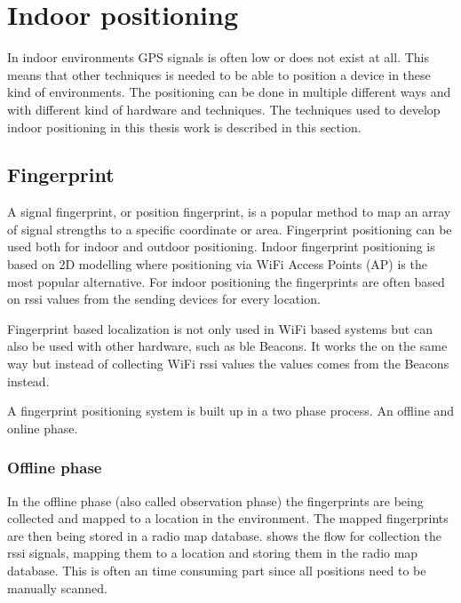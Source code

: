 \section{Indoor positioning} \label{sec:theoryIndoorPositioning}
In indoor environments GPS signals is often low or does not exist at all.
This means that other techniques is needed to be able to position a device in these kind of environments.
The positioning can be done in multiple different ways and with different kind of hardware and techniques.
The techniques used to develop indoor positioning in this thesis work is described in this section.



\subsection{Fingerprint}\label{sec:theoryFingerprint}
A signal fingerprint, or position fingerprint, is a popular method to map an array of signal strengths to a specific coordinate or area.
Fingerprint positioning can be used both for indoor and outdoor positioning.
Indoor fingerprint positioning is based on 2D modelling where positioning via WiFi Access Points (AP) is the most popular alternative.
For indoor positioning the fingerprints are often based on \acrshort{rssi} values from the sending devices for every location. 
\cite{LocationFingerprintingInfrastructure2004, IndoorFingerprintPositioning2017}

\bigskip

Fingerprint based localization is not only used in WiFi based systems but can also be used with other hardware, such as \acrshort{ble} Beacons.
It works the on the same way but instead of collecting WiFi \acrshort{rssi} values the values comes from the Beacons instead.
\cite{PracticalFingerprintingLocalization2017} 

\bigskip

A fingerprint positioning system is built up in a two phase process.
An offline and online phase.\cite{IndoorFingerprintPositioning2017} 

\subsubsection{Offline phase}\label{sec:theoryFingerprintOffline}
In the offline phase (also called observation phase) the fingerprints are being collected and mapped to a location in the environment.
The mapped fingerprints are then being stored in a radio map database.
 shows the flow for collection the \acrshort{rssi} signals, mapping them to a location and storing them in the radio map database.
This is often an time consuming part since all positions need to be manually scanned.\cite{IndoorFingerprintPositioning2017} 


